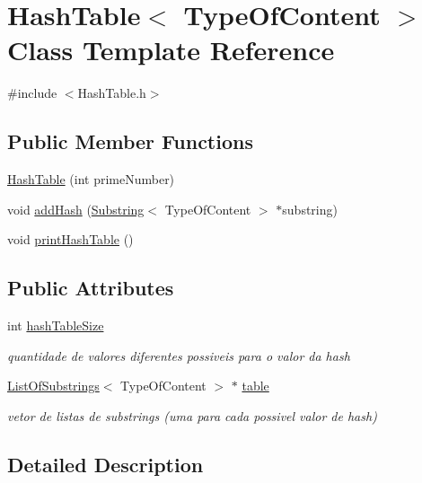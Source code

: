 \hypertarget{classHashTable}{\section{Hash\+Table$<$ Type\+Of\+Content $>$ Class Template Reference}
\label{classHashTable}
}


{\ttfamily \#include $<$Hash\+Table.\+h$>$}

\subsection*{Public Member Functions}
\begin{DoxyCompactItemize}
\item 
\hyperlink{classHashTable_a7eb799519445199cb568ea0c6dfe5e9d}{Hash\+Table} (int prime\+Number)
\item 
void \hyperlink{classHashTable_a26d5ad659135103f261c4ded31fda22e}{add\+Hash} (\hyperlink{classSubstring}{Substring}$<$ Type\+Of\+Content $>$ $\ast$substring)
\item 
void \hyperlink{classHashTable_a9575e866f5584fadffbcce7b7771c33c}{print\+Hash\+Table} ()
\end{DoxyCompactItemize}
\subsection*{Public Attributes}
\begin{DoxyCompactItemize}
\item 
int \hyperlink{classHashTable_ac09c30fbbee3c3a526220ed51074b957}{hash\+Table\+Size}
\begin{DoxyCompactList}\small\item\em quantidade de valores diferentes possiveis para o valor da hash \end{DoxyCompactList}\item 
\hyperlink{classListOfSubstrings}{List\+Of\+Substrings}$<$ Type\+Of\+Content $>$ $\ast$ \hyperlink{classHashTable_a1772210583a06ad2f1039e7fecbc588c}{table}
\begin{DoxyCompactList}\small\item\em vetor de listas de substrings (uma para cada possivel valor de hash) \end{DoxyCompactList}\end{DoxyCompactItemize}


\subsection{Detailed Description}
